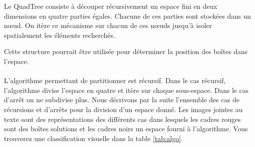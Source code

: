 Le QuadTree consiste à découper récursivement un espace fini en deux dimensions en quatre parties égales. Chacune de ces parties sont stockées dans un nœud. On itère ce mécanisme sur chacun de ces nœuds jusqu'à isoler spatialement les éléments recherchés.

Cette structure pourrait être utilisée pour déterminer la position des boîtes dans l'espace.

\paragraph{}L'algorithme permettant de partitionner est récursif. Dans le cas récursif, l'algorithme divise l'espace en quatre et itère sur chaque sous-espace. Dans le cas d'arrêt on ne subdivise plus. Nous décrivons par la suite l'ensemble des cas de récursions et d'arrêts pour la division d'un espace donné. Les images jointes au texte sont des représentations des différents cas dans lesquels les cadres rouges sont des boîtes solutions et les cadres noirs un espace fourni à l'algorithme. Vous trouverez une classification visuelle dans la table \ref{tab:algo}.
